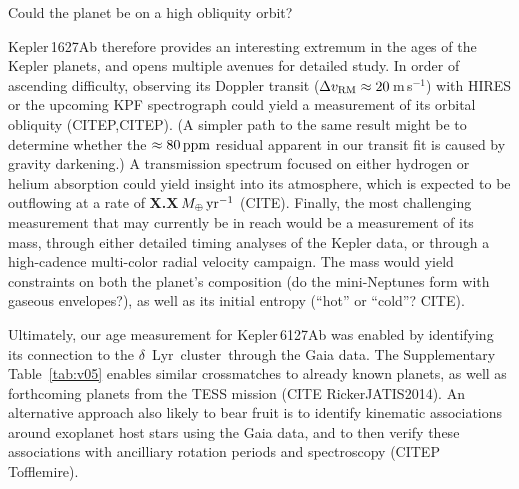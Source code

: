 \documentclass[12pt,modern,tighten]{aastex63}
\newcommand{\cn}{$\delta$~Lyr\ cluster} %
\newcommand{\ms}{\,m\,s$^{-1}$}
\begin{document}
Could the planet be on a high obliquity orbit?


Kepler\,1627Ab therefore provides an interesting extremum in the ages of the
Kepler planets, and opens multiple avenues for detailed
study.  In order of ascending difficulty, observing its
Doppler transit ($\Delta v_{\rm RM} \approx 20$\ms) with HIRES or the
upcoming KPF spectrograph could yield a measurement of its orbital
obliquity (CITEP,CITEP).  
(A simpler path to the same result might be to determine whether the
$\approx80\,{\rm ppm}$ residual apparent in our transit fit is caused
by gravity darkening.)
A transmission
spectrum focused on either hydrogen or helium absorption could yield
insight into its atmosphere, which is expected to be outflowing at a
rate of {\bf X.X}\,$M_\oplus\,{\rm yr}^{-1}$ (CITE).  Finally, the
most challenging measurement that may currently be in reach would be a
measurement of its mass, through either detailed timing analyses of
the Kepler data, or through a high-cadence multi-color radial velocity campaign.  The mass would yield constraints on both the planet's
composition (do the mini-Neptunes form with gaseous envelopes?), as
well as its initial entropy (``hot'' or ``cold''? CITE).

Ultimately, our age measurement for Kepler\,6127Ab was enabled by
identifying its connection to the \cn\ through the Gaia data.  The
Supplementary Table~\ref{tab:v05} enables similar crossmatches to
already known planets, as well as forthcoming planets from the TESS
mission (CITE RickerJATIS2014).  An alternative approach also
likely to bear fruit is to identify kinematic associations
around exoplanet host stars using the Gaia data, and to then verify
these associations with ancilliary rotation periods and spectroscopy
(CITEP Tofflemire).








\acknowledgements
\raggedbottom
\end{document}
